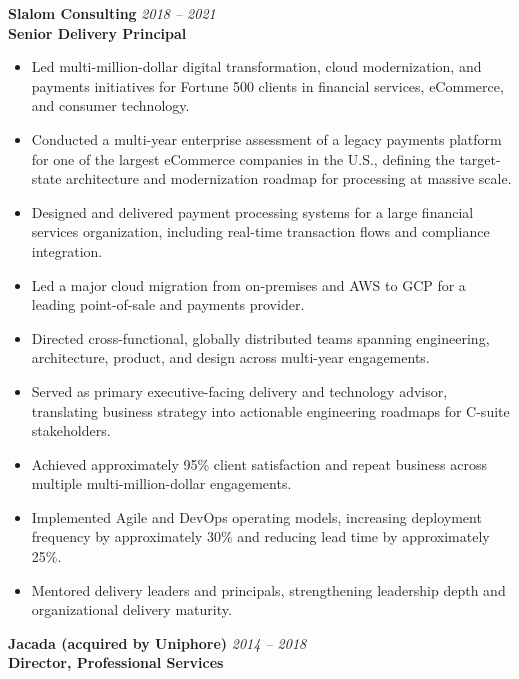 \documentclass[11pt]{article}
\begin{document}
\vspace{6pt}

\pagebreak

\textbf{Slalom Consulting} \hfill \textit{2018 -- 2021} \\
\textbf{Senior Delivery Principal}

\begin{itemize}
  \item Led multi-million-dollar digital transformation, cloud modernization, and payments initiatives for Fortune 500 clients in financial services, eCommerce, and consumer technology.
  \item Conducted a multi-year enterprise assessment of a legacy payments platform for one of the largest eCommerce companies in the U.S., defining the target-state architecture and modernization roadmap for processing at massive scale.
  \item Designed and delivered payment processing systems for a large financial services organization, including real-time transaction flows and compliance integration.
  \item Led a major cloud migration from on-premises and AWS to GCP for a leading point-of-sale and payments provider.
  \item Directed cross-functional, globally distributed teams spanning engineering, architecture, product, and design across multi-year engagements.
  \item Served as primary executive-facing delivery and technology advisor, translating business strategy into actionable engineering roadmaps for C-suite stakeholders.
  \item Achieved approximately 95\% client satisfaction and repeat business across multiple multi-million-dollar engagements.
  \item Implemented Agile and DevOps operating models, increasing deployment frequency by approximately 30\% and reducing lead time by approximately 25\%.
  \item Mentored delivery leaders and principals, strengthening leadership depth and organizational delivery maturity.
\end{itemize}

\vspace{6pt}

\textbf{Jacada (acquired by Uniphore)} \hfill \textit{2014 -- 2018} \\
\textbf{Director, Professional Services}
\end{document}
